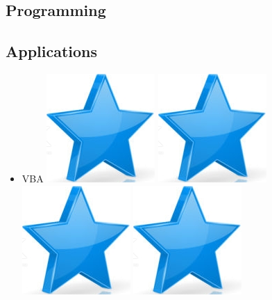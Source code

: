 \documentclass[10pt,a4paper,sans]{article}
\begin{document}
\begin{minipage}[t]{0.28\textwidth}
\begin{mdframed}[style=cadreCompetences]
        \section{Programming}
        \subsection{Applications}
            \begin{itemize}
                \item{VBA
                    \hfill
                    \includegraphics[scale=0.25]{img/star.png} \hspace{-0.22cm}
                    \includegraphics[scale=0.25]{img/star.png} \hspace{-0.22cm}
                    \includegraphics[scale=0.25]{img/star.png} \hspace{-0.22cm}
                    \includegraphics[scale=0.25]{img/star.png} \hspace{-0.22cm}
}
\end{itemize}
\end{mdframed}
\end{minipage}
\end{document}
